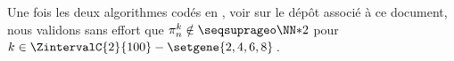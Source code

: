 \leavevmode
\smallskip

Une fois les deux algorithmes codés en \python, voir sur le dépôt associé à ce document, nous validons sans effort que $\consprod \notin \NNssquare$ pour $k \in \ZintervalC{2}{100} - \setgene{2, 4, 6, 8}$\,.

